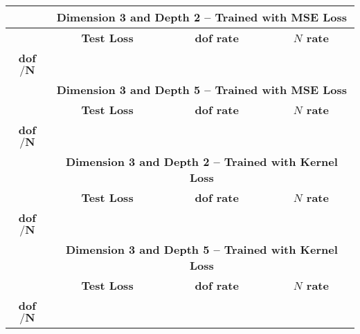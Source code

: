 \documentclass{article}
\newcommand{\Is}{N}
\begin{document}
\begin{adjustbox}{angle=90}
    \begin{tabular}{|c|cccc|cccc|cccc|}
        \hline
        & \multicolumn{12}{c|}{\bf Dimension 3 and Depth 2 -- Trained with MSE Loss} \\ \hline
        & \multicolumn{4}{c|}{\bf Test Loss} 
        & \multicolumn{4}{c|}{\bf dof rate}
        & \multicolumn{4}{c|}{\bf $N$ rate} \\ \hline
        {\bf dof$/\boldsymbol{\Is}$} %
         \\
        \hline
        \hline
        & \multicolumn{12}{c|}{\bf Dimension 3 and Depth 5 -- Trained with MSE Loss} \\ \hline
        & \multicolumn{4}{c|}{\bf Test Loss} 
        & \multicolumn{4}{c|}{\bf dof rate}
        & \multicolumn{4}{c|}{\bf $N$ rate} \\ \hline
        {\bf dof$/\boldsymbol{\Is}$} %
         \\
        \hline
        \hline
        & \multicolumn{12}{c|}{\bf Dimension 3 and Depth 2 -- Trained with Kernel Loss} \\ \hline
        & \multicolumn{4}{c|}{\bf Test Loss} 
        & \multicolumn{4}{c|}{\bf dof rate}
        & \multicolumn{4}{c|}{\bf $N$ rate} \\ \hline
        {\bf dof$/\boldsymbol{\Is}$} %
         \\
        \hline
        \hline
        & \multicolumn{12}{c|}{\bf Dimension 3 and Depth 5 -- Trained with Kernel Loss} \\ \hline
        & \multicolumn{4}{c|}{\bf Test Loss} 
        & \multicolumn{4}{c|}{\bf dof rate}
        & \multicolumn{4}{c|}{\bf $N$ rate} \\ \hline
        {\bf dof$/\boldsymbol{\Is}$} %
         \\
        \hline
    \end{tabular}
\end{adjustbox}
\end{document}
